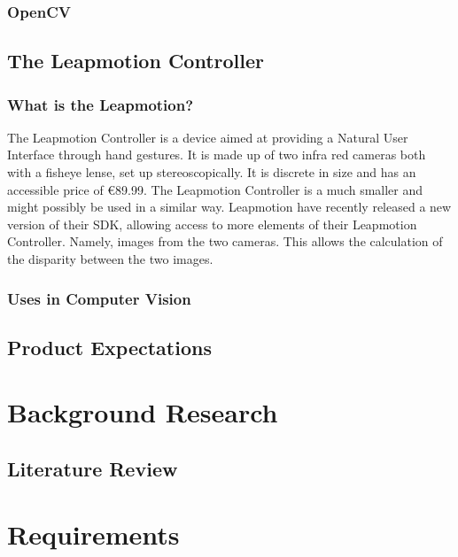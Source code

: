 \documentclass[12pt,a4paper]{report}
\begin{document}
			\subsection{OpenCV}
			
		\section{The Leapmotion Controller}
			\subsection{What is the Leapmotion?}
The Leapmotion Controller is a device aimed at providing a Natural User Interface through hand gestures.
It is made up of two infra red cameras both with a fisheye lense, set up stereoscopically.
It is discrete in size and has an accessible price of €89.99.
The Leapmotion Controller is a much smaller and might possibly be used in a similar way.
Leapmotion have recently released a new version of their SDK, allowing access to more elements of their Leapmotion Controller. 
Namely, images from the two cameras.
This allows the calculation of the disparity between the two images. %

			\subsection{Uses in Computer Vision}
		\section{Product Expectations}
		
	\chapter{Background Research}
		\section{Literature Review}
			

	\chapter{Requirements}
\end{document}
